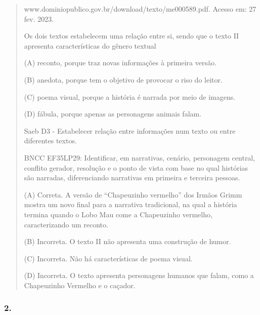 \begin{quote}
www.dominiopublico.gov.br/download/texto/me000589.pdf. Acesso em: 27
fev. 2023.

Os dois textos estabelecem uma relação entre si, sendo que o texto II
apresenta características do gênero textual

(A) reconto, porque traz novas informações à primeira versão.

(B) anedota, porque tem o objetivo de provocar o riso do leitor.

(C) poema visual, porque a história é narrada por meio de imagens.

(D) fábula, porque apenas as personagens animais falam.

Saeb D3 - Estabelecer relação entre informações num texto ou entre
diferentes textos.

BNCC EF35LP29: Identificar, em narrativas, cenário, personagem central,
conflito gerador, resolução e o ponto de vista com base no qual
histórias são narradas, diferenciando narrativas em primeira e terceira
pessoas.

(A) Correta. A versão de ``Chapeuzinho vermelho'' dos Irmãos Grimm
mostra um novo final para a narrativa tradicional, na qual a história
termina quando o Lobo Mau come a Chapeuzinho vermelho, caracterizando um
reconto.

(B) Incorreta. O texto II não apresenta uma construção de humor.

(C) Incorreta. Não há características de poema visual.

(D) Incorreta. O texto apresenta personagens humanos que falam, como a
Chapeuzinho Vermelho e o caçador.
\end{quote}

\subsubsection{2. }\label{section-85}

